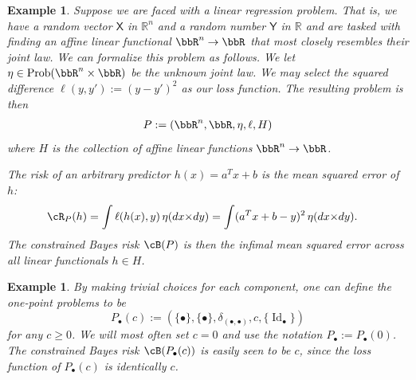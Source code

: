 \documentclass[twoside,11pt]{article}
\newtheorem{examples}[theorem]{Example}
\DeclareMathOperator{\prob}{Prob}
\DeclareMathOperator{\id}{Id}
\begin{document}
\begin{examples}\label{ex:linear-regression}
Suppose we are faced with a linear regression problem. That is, we have a random vector $\mathsf X$ in $\mathbb R^n$ and a random number $\mathsf Y$ in $\mathbb R$ and are tasked with finding an affine linear functional $\bbR^n \to \bbR$ that most closely resembles their joint law. We can formalize this problem as follows. We let $\eta \in \prob(
\bbR^n \times \bbR)$ be the unknown joint law. We may select the squared difference $\ell(y,y') := (y-y')^2$ as our loss function.
The resulting problem is then
\begin{align*}
    P := (\bbR^n,\bbR,\eta,\ell,H)
\end{align*}
where $H$ is the collection of affine linear functions $\bbR^n \to \bbR$.

The risk of an arbitrary predictor $h(x)=a^Tx+b$ is the mean squared error of $h$:
\begin{align*}
    \cR_P(h) = \int \ell(h(x),y)\,\eta(dx{\times}dy) & = \int (a^Tx+b-y)^2\, \eta(dx{\times} dy).
\end{align*}
The constrained Bayes risk $\cB(P)$ is then the infimal mean squared error across all linear functionals $h\in H$. 

\end{examples}

\begin{examples}\label{ex:one-point-problem}
    By making trivial choices for each component, one can define the \emph{one-point problems} to be
    \[P_\bullet(c) := (\{\bullet\},\{\bullet\},\delta_{(\bullet,\bullet)}, c, \{\id_{\bullet}\})\]
    for any $c \geq 0$. We will most often set $c=0$ and use the notation $P_\bullet := P_\bullet(0)$.
    The constrained Bayes risk $\cB(P_\bullet(c))$ is easily seen to be $c$, since the loss function of $P_\bullet(c)$ is identically $c$.
\end{examples}
\end{document}
